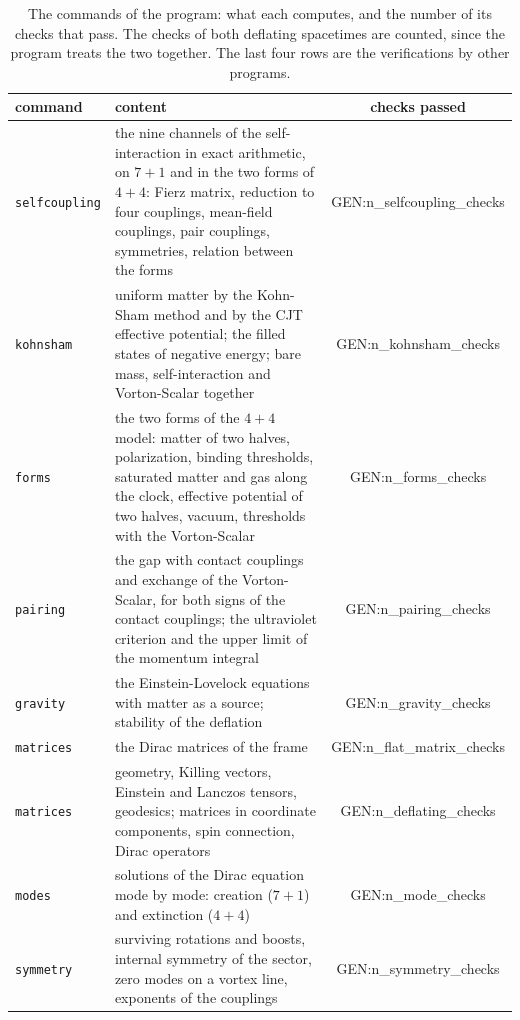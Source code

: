 \begin{table}
\caption{\label{tab:checks}The commands of the program: what each computes, and the number of its
checks that pass. The checks of both deflating spacetimes are counted, since the program treats the
two together. The last four rows are the verifications by other programs.}
\begin{ruledtabular}
\begin{tabular}{lp{}c}
command & content & checks passed \\
\hline
\texttt{selfcoupling} & the nine channels of the self-interaction in exact arithmetic, on $7+1$ and in the two forms of $4+4$: Fierz matrix, reduction to four couplings, mean-field couplings, pair couplings, symmetries, relation between the forms & {{GEN:n_selfcoupling_checks}} \\
\texttt{kohnsham} & uniform matter by the Kohn-Sham method and by the CJT effective potential; the filled states of negative energy; bare mass, self-interaction and Vorton-Scalar together & {{GEN:n_kohnsham_checks}} \\
\texttt{forms} & the two forms of the $4+4$ model: matter of two halves, polarization, binding thresholds, saturated matter and gas along the clock, effective potential of two halves, vacuum, thresholds with the Vorton-Scalar & {{GEN:n_forms_checks}} \\
\texttt{pairing} & the gap with contact couplings and exchange of the Vorton-Scalar, for both signs of the contact couplings; the ultraviolet criterion and the upper limit of the momentum integral & {{GEN:n_pairing_checks}} \\
\texttt{gravity} & the Einstein-Lovelock equations with matter as a source; stability of the deflation & {{GEN:n_gravity_checks}} \\
\texttt{matrices} & the Dirac matrices of the frame & {{GEN:n_flat_matrix_checks}} \\
\texttt{matrices} & geometry, Killing vectors, Einstein and Lanczos tensors, geodesics; matrices in coordinate components, spin connection, Dirac operators & {{GEN:n_deflating_checks}} \\
\texttt{modes} & solutions of the Dirac equation mode by mode: creation ($7+1$) and extinction ($4+4$) & {{GEN:n_mode_checks}} \\
\texttt{symmetry} & surviving rotations and boosts, internal symmetry of the sector, zero modes on a vortex line, exponents of the couplings & {{GEN:n_symmetry_checks}} \\

\end{tabular}
\end{ruledtabular}
\end{table}
